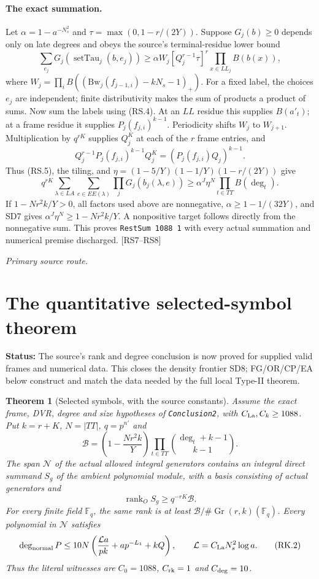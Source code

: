 \documentclass[11pt,a4paper]{article}
\numberwithin{equation}{section}
\newtheorem{theorem}{Theorem}[section]
\theoremstyle{remark}\newtheorem{remark}[theorem]{Remark}
\newcommand{\status}[1]{\textbf{Status:} #1}
\begin{document}
\paragraph{The exact summation.}
Let $\alpha=1-a^{-N_s^2}$ and $\tau=\max(0,1-r/(2Y))$.
Suppose $G_j(b)\ge0$ depends only on late degrees and obeys the source's
terminal-residue lower bound
\[
 \sum_{e_j}G_j(\operatorname{setTau}_j(b,e_j))
 \ge\alpha W_j[Q_j^{r-1}\tau]^r\prod_{x\in LL_j}B(b(x)),
\]
where $W_j=\prod_i B((\mathrm{Bw}_j(f_{j-1,i})-kN_s-1)_+)$.
For a fixed label, the choices $e_j$ are independent; finite
distributivity makes the sum of products a product of sums.
Now sum the labels using (RS.4). At an $LL$ residue this supplies
$B(a'_t)$; at a frame residue it supplies $P_j(f_{j,i})^{k-1}$.
Periodicity shifts $W_j$ to $W_{j+1}$. Multiplication by $q^{rK}$
supplies $Q_j^K$ at each of the $r$ frame entries, and
\[
 Q_j^{r-1}P_j(f_{j,i})^{k-1}Q_j^K
   =(P_j(f_{j,i})Q_j)^{k-1}.
\]
Thus (RS.5), the tiling, and $\eta=(1-5/Y)(1-1/Y)(1-r/(2Y))$ give
\[
 q^{rK}\sum_{\lambda\in LA}\sum_{e\in EE(\lambda)}
       \prod_jG_j(b_j(\lambda,e))
 \ge\alpha^J\eta^N\prod_{t\in TT}B(\deg_t).
 \tag{RS.6}
\]
If $1-Nr^2k/Y>0$, all factors used above are nonnegative,
$\alpha\ge1-1/(32Y)$, and SD7 gives
$\alpha^J\eta^N\ge1-Nr^2k/Y$.
A nonpositive target follows directly from the nonnegative sum.
This proves \texttt{RestSum 1088 1} with every actual summation and
numerical premise discharged. \textsf{[RS7--RS8]}


\noindent\textit{Primary source route.}\cite{residue-sum}

\section{The quantitative selected-symbol theorem}\label{sec:rank-closure}

\status{The source's rank and degree conclusion is now proved for supplied
valid frames and numerical data. This closes the density frontier SD8;
FG/OR/CP/EA below construct and match the data needed by the full local Type-II theorem.}

\begin{theorem}[Selected symbols, with the source constants]
Assume the exact frame, DVR, degree and size hypotheses of
\texttt{Conclusion2}, with $C_{\rm La},C_k\ge1088$.
Put $k=r+K$, $N=|TT|$, $q=p^{n'}$ and
\[
 \mathcal B=\left(1-\frac{Nr^2k}{Y}\right)
       \prod_{t\in TT}\binom{\deg_t+k-1}{k-1}.
\]
The span $\mathcal N$ of the actual allowed integral generators contains
an integral direct summand $S_g$ of the ambient polynomial module,
with a basis consisting of actual generators and
\[
 \operatorname{rank}_O S_g\ge q^{-rK}\mathcal B.
 \tag{RK.1}
\]
For every finite field $\mathbb F_q$, the same rank is at least
$\mathcal B/\#\operatorname{Gr}(r,k)(\mathbb F_q)$.
Every polynomial in $\mathcal N$ satisfies
\[
 \deg_{\rm normal}P\le
 10N\left(\frac{\mathcal L a}{pk}+ap^{-L_1}+kQ\right),
 \qquad \mathcal L=C_{\rm La}N_s^2\log a.
 \tag{RK.2}
\]
Thus the literal witnesses are $C_0=1088$, $C_{\rm rk}=1$ and
$C_{\rm deg}=10$.
\end{theorem}
\end{document}
